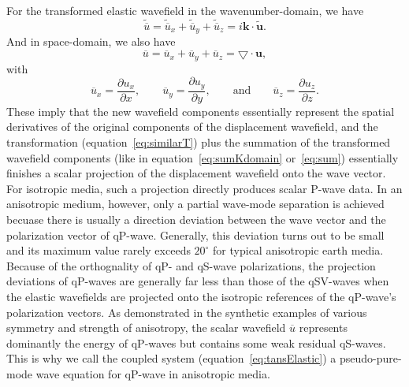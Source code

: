 For the transformed elastic wavefield in the wavenumber-domain, we have
\begin{equation}
\label{eq:sumKdomain}
\widetilde{\overline{u}} = \widetilde{\overline{u}}_x + \widetilde{\overline{u}}_y + \widetilde{\overline{u}}_z
             = i\mathbf{k}\cdot{\widetilde{\mathbf{u}}}.
\end{equation}
And in space-domain, we also have
\begin{equation}
\label{eq:sum}
\overline{u} = \overline{u}_x + \overline{u}_y + \overline{u}_z
             = \bigtriangledown\cdot{\mathbf{u}},
\end{equation}
with
\begin{equation}
\label{eq:Deriv}
\overline{u}_x = \frac{\partial u_x}{\partial x},\qquad \overline{u}_y = \frac{\partial u_y}{\partial y},\qquad \mbox{and} \qquad \overline{u}_z=\frac{\partial u_z}{\partial z}.
\end{equation}
These imply that the new wavefield components essentially represent the spatial derivatives of the original
components of the displacement wavefield, and the transformation (equation~\ref{eq:similarT})
plus the summation of the transformed wavefield components (like in equation~\ref{eq:sumKdomain} or~\ref{eq:sum})
essentially finishes a scalar projection of the displacement wavefield onto the wave vector. 
For isotropic media, such a projection directly produces scalar P-wave data. In an anisotropic medium,
 however, only a partial wave-mode separation is achieved becuase there is usually a direction deviation 
between the wave vector and the polarization vector of qP-wave.
Generally, this deviation turns out to be small and
its maximum value rarely exceeds $20^\circ$ for typical anisotropic earth media\mbox{\cite[]{psencik:1998}}.
Because of the orthognality of qP- and qS-wave polarizations, the projection deviations of qP-waves are generally
far less than those of the qSV-waves when the elastic wavefields are projected onto the isotropic references
of the qP-wave's polarization vectors.
As demonstrated in the synthetic examples of various symmetry and strength of anisotropy, 
	the scalar wavefield $\overline{u}$ represents dominantly
the energy of qP-waves but contains some weak residual qS-waves.
This is why we call the coupled system (equation~\ref{eq:tansElastic}) a pseudo-pure-mode wave equation
for qP-wave in anisotropic media.

